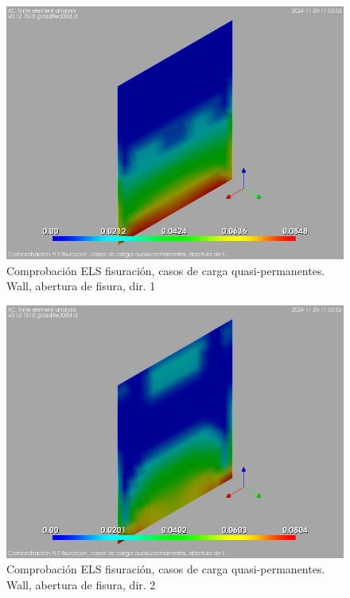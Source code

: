 \begin{figure}[ht]
\begin{center}
\includegraphics[width=\linewidth]{results/graphics/crackingSLS_qperm/wallwkSect1}
\caption{Comprobación ELS fisuración, casos de carga quasi-permanentes. Wall, abertura de fisura, dir. 1}
\label{SLS_quasiPermanentLoadsCrackControlwallwkSect1}
\end{center}
\end{figure}
\begin{figure}[ht]
\begin{center}
\includegraphics[width=\linewidth]{results/graphics/crackingSLS_qperm/wallwkSect2}
\caption{Comprobación ELS fisuración, casos de carga quasi-permanentes. Wall, abertura de fisura, dir. 2}
\label{SLS_quasiPermanentLoadsCrackControlwallwkSect2}
\end{center}
\end{figure}
